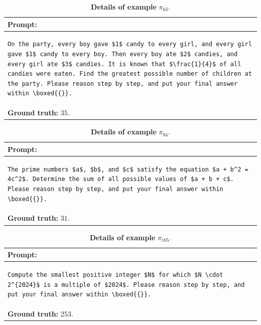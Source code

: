 \begin{table}[htbp]
\centering
\caption{\textbf{Details of example} $\pi_{63}$.}
\begin{tabular}{p{}}
\toprule
\textbf{Prompt:} \\
\midrule
\footnotesize
\begin{lstlisting}[breaklines=true, basicstyle=\ttfamily, aboveskip=-1.0em, belowskip=0pt, breakindent=0pt]
On the party, every boy gave $1$ candy to every girl, and every girl gave $1$ candy to every boy. Then every boy ate $2$ candies, and every girl ate $3$ candies. It is known that $\frac{1}{4}$ of all candies were eaten. Find the greatest possible number of children at the party. Please reason step by step, and put your final answer within \boxed{{}}.
\end{lstlisting} \\
\midrule
\textbf{Ground truth:} $35$. \\
\bottomrule
\end{tabular}
\end{table}


\begin{table}[htbp]
\centering
\caption{\textbf{Details of example} $\pi_{84}$.}
\begin{tabular}{p{}}
\toprule
\textbf{Prompt:} \\
\midrule
\footnotesize
\begin{lstlisting}[breaklines=true, basicstyle=\ttfamily, aboveskip=-1.0em, belowskip=0pt, breakindent=0pt]
The prime numbers $a$, $b$, and $c$ satisfy the equation $a + b^2 = 4c^2$. Determine the sum of all possible values of $a + b + c$. Please reason step by step, and put your final answer within \boxed{{}}.
\end{lstlisting} \\
\midrule
\textbf{Ground truth:} $31$. \\
\bottomrule
\end{tabular}
\end{table}


\begin{table}[htbp]
\centering
\caption{\textbf{Details of example} $\pi_{105}$.}
\begin{tabular}{p{}}
\toprule
\textbf{Prompt:} \\
\midrule
\footnotesize
\begin{lstlisting}[breaklines=true, basicstyle=\ttfamily, aboveskip=-1.0em, belowskip=0pt, breakindent=0pt]
Compute the smallest positive integer $N$ for which $N \cdot 2^{2024}$ is a multiple of $2024$. Please reason step by step, and put your final answer within \boxed{{}}.
\end{lstlisting} \\
\midrule
\textbf{Ground truth:} $253$. \\
\bottomrule
\end{tabular}
\end{table}


